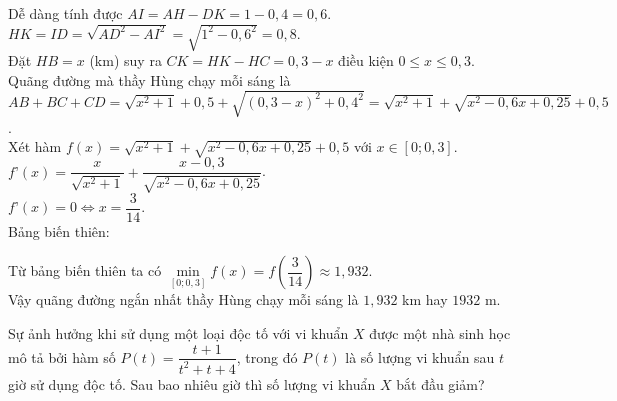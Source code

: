 \begin{bt}
{\begin{center}
{
			 }
		\end{center}
		 Dễ dàng tính được $AI=AH-DK=1-0{,}4=0{,}6$.\\
		 $HK=ID=\sqrt{AD^2-AI^2}=\sqrt{1^2-0{,}6^2}=0{,}8$.\\
		Đặt $HB=x$ (km) suy ra $CK=HK-HC=0{,}3-x$ điều  kiện $0\leq x\leq 0{,}3$.\\
		Quãng  đường mà thầy Hùng chạy mỗi sáng là\\ $AB+BC+CD=\sqrt{x^2+1}+0{,}5+\sqrt{(0{,}3-x)^2+0{,}4^2}=\sqrt{x^2+1}+\sqrt{x^2-0{,}6x+0{,}25}+0{,}5$.\\
		Xét  hàm $f(x)=\sqrt{x^2+1}+\sqrt{x^2-0{,}6x+0{,}25}+0{,}5$ với $x\in[0; 0{,}3]$.\\
		$f’(x)=\dfrac{x}{\sqrt{x^2+1}}+\dfrac{x-0{,}3}{\sqrt{x^2-0{,}6x+0{,}25}}$.\\ 
		$f’(x)=0\Leftrightarrow  x=\dfrac{3}{14}$.\\
		Bảng biến  thiên:
		\begin{center}
		\end{center}
		Từ bảng biến thiên ta có $\min\limits_{[0; 0{,}3]}  f(x)=f\left(\dfrac{3}{14}\right)\approx 1{,}93 2$.\\
	Vậy quãng đường ngắn nhất thầy Hùng chạy mỗi sáng là $1{,}932$ km  hay $1932$ m.}
\end{bt}

\begin{bt}%
	Sự ảnh hưởng khi sử dụng một loại độc tố với vi khuẩn $ X$ được một nhà sinh học mô tả bởi hàm số $ P(t)=\dfrac{t+1}{t^2+t+4}$, trong đó $P(t)$ là số lượng vi khuẩn sau $t$  giờ sử dụng độc tố. Sau bao nhiêu giờ thì số lượng vi khuẩn $ X$ bắt đầu giảm?
\end{bt}

